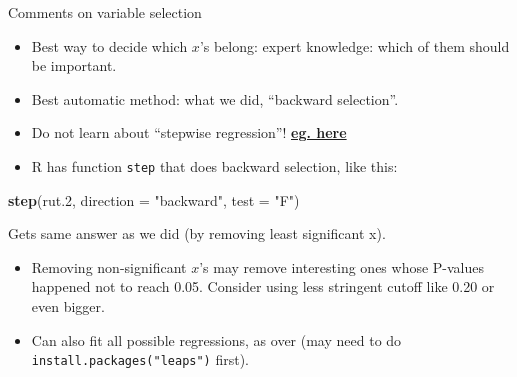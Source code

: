 \documentclass[ignorenonframetext,]{beamer}
\newenvironment{Shaded}{\begin{snugshade}}{\end{snugshade}}
\newcommand{\DataTypeTok}[1]{\textcolor[rgb]{0.13,0.29,0.53}{#1}}
\newcommand{\FloatTok}[1]{\textcolor[rgb]{0.00,0.00,0.81}{#1}}
\newcommand{\KeywordTok}[1]{\textcolor[rgb]{0.13,0.29,0.53}{\textbf{#1}}}
\newcommand{\NormalTok}[1]{#1}
\newcommand{\StringTok}[1]{\textcolor[rgb]{0.31,0.60,0.02}{#1}}
\providecommand{\tightlist}{%
  \setlength{\itemsep}{0pt}\setlength{\parskip}{0pt}}
\begin{document}
\begin{frame}[fragile]{Comments on variable selection}
\protect\hypertarget{comments-on-variable-selection}{}

\begin{itemize}
\tightlist
\item
  Best way to decide which \(x\)'s belong: expert knowledge: which of
  them should be important.
\item
  Best automatic method: what we did, ``backward selection''.
\item
  Do not learn about ``stepwise regression''!
  \href{https://towardsdatascience.com/stopping-stepwise-why-stepwise-selection-is-bad-and-what-you-should-use-instead-90818b3f52df}{\textbf{eg.
  here}}
\item
  R has function \texttt{step} that does backward selection, like this:
\end{itemize}

\begin{Shaded}
\begin{Highlighting}[]
\KeywordTok{step}\NormalTok{(rut}\FloatTok{.2}\NormalTok{, }\DataTypeTok{direction =} \StringTok{"backward"}\NormalTok{, }\DataTypeTok{test =} \StringTok{"F"}\NormalTok{)}
\end{Highlighting}
\end{Shaded}

Gets same answer as we did (by removing least significant x).

\begin{itemize}
\tightlist
\item
  Removing non-significant \(x\)'s may remove interesting ones whose
  P-values happened not to reach 0.05. Consider using less stringent
  cutoff like 0.20 or even bigger.
\item
  Can also fit all possible regressions, as over (may need to do
  \texttt{install.packages("leaps")} first).
\end{itemize}

\end{frame}
\end{document}
